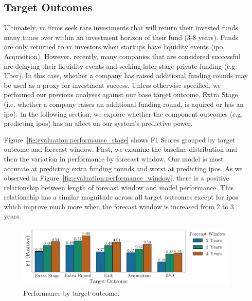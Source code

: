 \documentclass[../thesis/thesis.tex]{subfiles}
\begin{document}
\subsection{Target Outcomes}

Ultimately, \gls{vc} firms seek rare investments that will return their invested funds many times over within an investment horizon of their fund (3-8 years). Funds are only returned to \gls{vc} investors when startups have liquidity events (\gls{ipo}, Acquisition). However, recently, many companies that are considered successful are delaying their liquidity events and seeking later-stage private funding (e.g. Uber). In this case, whether a company has raised additional funding rounds may be used as a proxy for investment success. Unless otherwise specified, we performed our previous analyses against our base target outcome, Extra Stage (i.e. whether a company raises an additional funding round, is aquired or has an \gls{ipo}). In the following section, we explore whether the component outcomes (e.g. predicting \gls{ipo}s) has an affect on our system's predictive power.

Figure~\ref{fig:evaluation:performance_stage} shows F1 Scores grouped by target outcome and forecast window. First, we examine the baseline distribution and then the variation in performance by forecast window. Our model is most accurate at predicting extra funding rounds and worst at predicting \gls{ipo}s. As we observed in Figure~\ref{fig:evaluation:performance_window}, there is a positive relationship between length of forecast window and model performance. This relationship has a similar magnitude across all target outcomes except for \gls{ipo}s which improve much more when the forecast window is increased from 2 to 3 years.

\begin{figure}[!htb]
    \centering
    \includegraphics[width=\textwidth]{../figures/evaluation/performance_outcome}
    \caption[Performance by target outcome]{Performance by target outcome.}
    \label{fig:evaluation:f1_predictive_outcome}
\end{figure}
\end{document}
